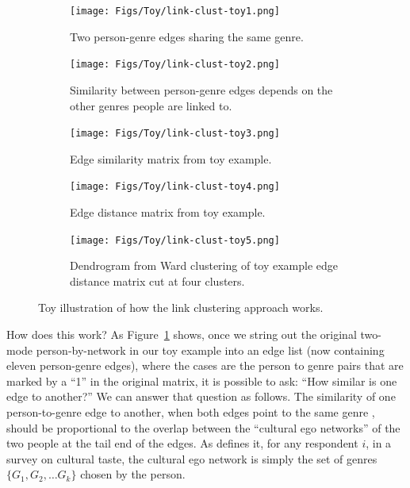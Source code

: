 \documentclass[a4paper,12pt]{extarticle}
\begin{document}
\begin{figure}[ht!]
     \centering
     \begin{subfigure}[b]{0.6\textwidth}
        \texttt{[image: Figs/Toy/link-clust-toy1.png]}
        \caption{Two person-genre edges sharing the same genre.}
        \label{fig:link-toy1}
    \end{subfigure} 
     \begin{subfigure}[b]{0.3\textwidth}
        \texttt{[image: Figs/Toy/link-clust-toy2.png]}
        \caption{Similarity between person-genre edges depends on the other genres people are linked to.}
        \label{fig:link-toy2}
    \end{subfigure}
     \begin{subfigure}[b]{0.45\textwidth}
        \texttt{[image: Figs/Toy/link-clust-toy3.png]}
        \caption{Edge similarity matrix from toy example.}
        \label{fig:link-toy3}
    \end{subfigure}
     \begin{subfigure}[b]{0.45\textwidth}
        \texttt{[image: Figs/Toy/link-clust-toy4.png]}
        \caption{Edge distance matrix from toy example.}
        \label{fig:link-toy4}
    \end{subfigure}
     \begin{subfigure}[b]{0.6\textwidth}
        \texttt{[image: Figs/Toy/link-clust-toy5.png]}
        \caption{Dendrogram from Ward clustering of toy example edge distance matrix cut at four clusters.}
        \label{fig:link-toy5}
    \end{subfigure}
    \caption{Toy illustration of how the link clustering approach works.}
    \label{fig:link-toy}
 \end{figure}
 
How does this work? As Figure~\ref{fig:link-toy1} shows, once we string out the original two-mode person-by-network in our toy example into an edge list (now containing eleven person-genre edges), where the cases are the person to genre pairs that are marked by a ``1'' in the original matrix, it is possible to ask: ``How similar is one edge to another?'' We can answer that question as follows. The similarity of one person-to-genre edge to another, when both edges point to the same genre \citep{ahn_etal10}, should be proportional to the overlap between the ``cultural ego networks'' of the two people at the tail end of the edges. As \citet{lizardo14} defines it, for any respondent $i$, in a survey on cultural taste, the cultural ego network is simply the set of genres $\{G_1, G_2,\dots G_k\}$ chosen by the person. 
\end{document}
